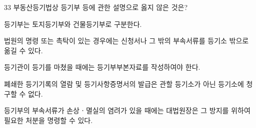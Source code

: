 \begin{question}{33}
부동산등기법상 등기부 등에 관한 설명으로 옳지 않은 것은?
\begin{choices}
  \item 등기부는 토지등기부와 건물등기부로 구분한다.
  \item 법원의 명령 또는 촉탁이 있는 경우에는 신청서나 그 밖의 부속서류를 등기소 밖으로 옮길 수 있다.
  \item 등기관이 등기를 마쳤을 때에는 등기부부본자료를 작성하여야 한다.
  \item 폐쇄한 등기기록의 열람 및 등기사항증명서의 발급은 관할 등기소가 아닌 등기소에 청구할 수 없다.
  \item 등기부의 부속서류가 손상ㆍ멸실의 염려가 있을 때에는 대법원장은 그 방지를 위하여 필요한 처분을 명령할 수 있다.
\end{choices}
\end{question}
